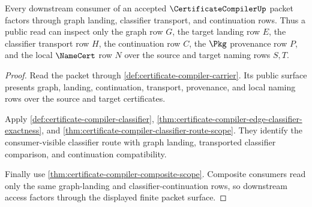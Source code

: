 \begin{theorem}
\label{thm:certificate-compiler-public-consumer-boundary}
Every downstream consumer of an accepted $\CertificateCompilerUp$ packet
factors through graph landing, classifier transport, and continuation rows.
Thus a public read can inspect only the graph row $G$, the target landing row
$E$, the classifier transport row $H$, the continuation row $C$, the
$\Pkg$ provenance row $P$, and the local $\NameCert$ row $N$ over the source
and target naming rows $S,T$.
\end{theorem}
\begin{proof}
Read the packet through \autoref{def:certificate-compiler-carrier}. Its public
surface presents graph, landing, continuation, transport, provenance, and
local naming rows over the source and target certificates.

Apply \autoref{def:certificate-compiler-classifier},
\autoref{thm:certificate-compiler-edge-classifier-exactness}, and
\autoref{thm:certificate-compiler-classifier-route-scope}. They identify the
consumer-visible classifier route with graph landing, transported classifier
comparison, and continuation compatibility.

Finally use \autoref{thm:certificate-compiler-composite-scope}. Composite
consumers read only the same graph-landing and classifier-continuation rows,
so downstream access factors through the displayed finite packet surface.
\end{proof}

